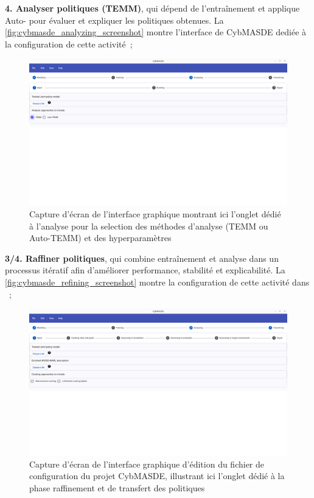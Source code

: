 \textbf{4. Analyser politiques (TEMM)}, qui dépend de l’entraînement et applique Auto- pour évaluer et expliquer les politiques obtenues. La \autoref{fig:cybmasde_analyzing_screenshot} montre l'interface de CybMASDE dediée à la configuration de cette activité~;

\begin{figure}[h!]
  \centering
  \includegraphics[trim=0cm 20cm 0cm 0cm, clip,width=\linewidth]{figures/analyzing_screenshot.png}
  \caption{Capture d'écran de l'interface graphique montrant ici l'onglet dédié à l'analyse pour la selection des méthodes d'analyse (TEMM ou Auto-TEMM) et des hyperparamètres}
  \label{fig:cybmasde_analyzing_screenshot}
\end{figure}

\textbf{3/4. Raffiner politiques}, qui combine entraînement et analyse dans un processus itératif afin d’améliorer performance, stabilité et explicabilité. La \autoref{fig:cybmasde_refining_screenshot} montre la configuration de cette activité dans ~;

\begin{figure}[h!]
  \centering
  \includegraphics[trim=0cm 15cm 0cm 0cm, clip,width=\linewidth]{figures/refining.png}
  \caption{Capture d'écran de l'interface graphique d'édition du fichier de configuration du projet CybMASDE, illustrant ici l'onglet dédié à la phase raffinement et de transfert des politiques}
  \label{fig:cybmasde_refining_screenshot}
\end{figure}

